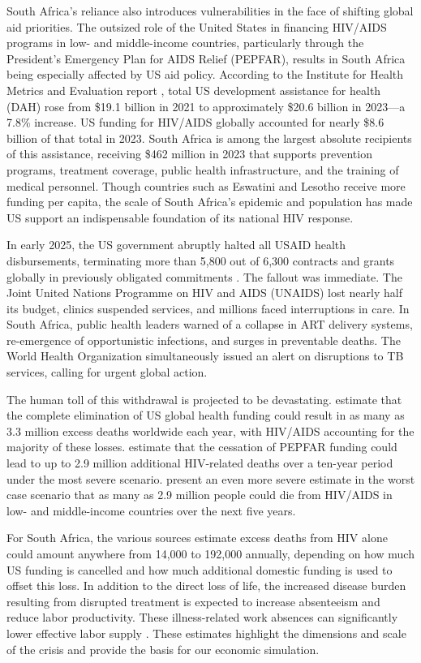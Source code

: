 \documentclass[letterpaper,12pt]{article}
\theoremstyle{definition}
\begin{document}
\begin{spacing}{1.5}
South Africa's reliance also introduces vulnerabilities in the face of shifting global aid priorities. The outsized role of the United States in financing HIV/AIDS programs in low- and middle-income countries, particularly through the President's Emergency Plan for AIDS Relief (PEPFAR), results in South Africa being especially affected by US aid policy. According to the Institute for Health Metrics and Evaluation report \citep{FGH2023}, total US development assistance for health (DAH) rose from \$19.1 billion in 2021 to approximately \$20.6 billion in 2023—a 7.8\% increase. US funding for HIV/AIDS globally accounted for nearly \$8.6 billion of that total in 2023. South Africa is among the largest absolute recipients of this assistance, receiving \$462 million in 2023 that supports prevention programs, treatment coverage, public health infrastructure, and the training of medical personnel. Though countries such as Eswatini and Lesotho receive more funding per capita, the scale of South Africa's epidemic and population has made US support an indispensable foundation of its national HIV response.

In early 2025, the US government abruptly halted all USAID health disbursements, terminating more than 5,800 out of 6,300 contracts and grants globally in previously obligated commitments \citep{Cohen2025}. The fallout was immediate. The Joint United Nations Programme on HIV and AIDS (UNAIDS) lost nearly half its budget, clinics suspended services, and millions faced interruptions in care. In South Africa, public health leaders warned of a collapse in ART delivery systems, re-emergence of opportunistic infections, and surges in preventable deaths. The World Health Organization simultaneously issued an alert on disruptions to TB services, calling for urgent global action.

The human toll of this withdrawal is projected to be devastating. \citet{KS2025} estimate that the complete elimination of US global health funding could result in as many as 3.3 million excess deaths worldwide each year, with HIV/AIDS accounting for the majority of these losses. \citet{Gandhi2025} estimate that the cessation of PEPFAR funding could lead to up to 2.9 million additional HIV-related deaths over a ten-year period under the most severe scenario.  present an even more severe estimate in the worst case scenario that as many as 2.9 million people could die from HIV/AIDS in low- and middle-income countries over the next five years.

For South Africa, the various sources estimate excess deaths from HIV alone could amount anywhere from 14,000 to 192,000 annually, depending on how much US funding is cancelled and how much additional domestic funding is used to offset this loss. In addition to the direct loss of life, the increased disease burden resulting from disrupted treatment is expected to increase absenteeism and reduce labor productivity. These illness-related work absences can significantly lower effective labor supply \citep{Keogh2024,Panda2024}. These estimates highlight the dimensions and scale of the crisis and provide the basis for our economic simulation.


\end{spacing}
\end{document}

